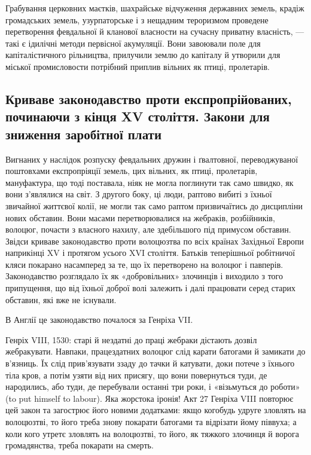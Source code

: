 Грабування церковних маєтків, шахрайське відчуження державних
земель, крадіж громадських земель, узурпаторське і з
нещадним тероризмом проведене перетворення февдальної й
кланової власности на сучасну приватну власність, — такі є
ідилічні методи первісної акумуляції. Вони завоювали поле
для капіталістичного рільництва, прилучили землю до капіталу
й утворили для міської промисловости потрібний приплив вільних
як птиці, пролетарів.

\subsection{Криваве законодавство проти експропрійованих, починаючи
з кінця XV століття. Закони для зниження заробітної плати}

Вигнаних у наслідок розпуску февдальних дружин і ґвалтовної,
переводжуваної поштовхами експропріяції земель, цих
вільних, як птиці, пролетарів, мануфактура, що тоді поставала,
ніяк не могла поглинути так само швидко, як вони з’являлися
на світ. З другого боку, ці люди, раптово вибиті з їхньої звичайної
життєвої колії, не могли так само раптом призвичаїтись до
дисципліни нових обставин. Вони масами перетворювалися на
жебраків, розбійників, волоцюг, почасти з власного нахилу,
але здебільшого під примусом обставин. Звідси криваве законодавство
проти волоцюзтва по всіх країнах Західньої Европи
наприкінці XV і протягом усього XVI століття. Батьків теперішньої
робітничої кляси покарано насамперед за те, що їх перетворено
на волоцюг і павперів. Законодавство розглядало
їх як «добровільних» злочинців і виходило з того припущення,
що від їхньої доброї волі залежить і далі працювати серед старих
обставин, які вже не існували.

В Англії це законодавство почалося за Генріха VII.

Генріх VIII, 1530: старі й нездатні до праці жебраки дістають
дозвіл жебракувати. Навпаки, працездатних волоцюг слід карати
батогами й замикати до в’язниць. Їх слід прив’язувати ззаду до
тачки й катувати, доки потече з їхнього тіла кров, а потім узяти
від них присягу, що вони повернуться туди, де народились,
або туди, де перебували останні три роки, і «візьмуться до роботи»
(to put himself to labour). Яка жорстока іронія! Акт 27
Генріха VIII повторює цей закон та загострює його новими додатками:
якщо когобудь удруге зловлять на волоцюзтві, то його
треба знову покарати батогами та відрізати йому піввуха; а
коли кого утретє зловлять на волоцюзтві, то його, як тяжкого
злочинця й ворога громадянства, треба покарати на смерть.

